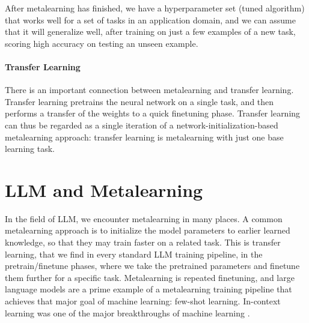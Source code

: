 

    
After metalearning has finished, we have a hyperparameter set (tuned algorithm) that works well for a set of tasks in an application domain, and we can assume that it will generalize well, after training on just a few examples of a new task, scoring high accuracy on testing an unseen example.

\paragraph{Transfer Learning}
There is an important connection between metalearning and transfer learning. Transfer learning pretrains the neural network on a single task, and then performs a transfer of the weights to a quick finetuning phase. %
Transfer learning can thus be regarded as a single iteration of a network-initialization-based metalearning approach: transfer learning is metalearning with just one base learning task.


    
\section{LLM and Metalearning}
In the field of LLM, we encounter metalearning in many places. 
A common metalearning approach is to initialize the model parameters to earlier learned knowledge, so that they may train faster on a related task. This is  transfer learning, that we find in every standard LLM training pipeline, in the pretrain/finetune phases, where  we take the pretrained parameters and finetune them further for a specific task. Metalearning is repeated finetuning, and large language models are a prime example of a metalearning training pipeline that achieves that major goal of machine learning: few-shot learning. In-context learning was one of the major breakthroughs of machine learning \citep{brown2020language}.

